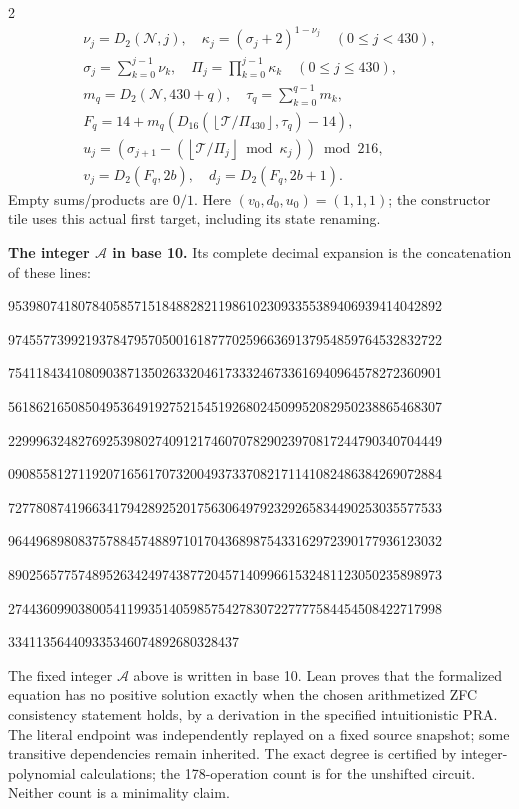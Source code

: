 \documentclass[10pt]{article}
\newcommand{\fl}[1]{\left\lfloor#1\right\rfloor}
\begin{document}
\begin{multicols}{2}
\[\begin{gathered}
\nu_j=D_2(\mathcal N,j),\quad \kappa_j=(\sigma_j+2)^{1-\nu_j}\quad(0\le j<430),\\
\sigma_j=\sum_{k=0}^{j-1}\nu_k,\quad
\Pi_j=\prod_{k=0}^{j-1}\kappa_k\quad(0\le j\le430),\\
m_q=D_2(\mathcal N,430+q),\quad \tau_q=\sum_{k=0}^{q-1}m_k,\\
F_q=14+m_q(D_{16}(\fl{\mathcal T/\Pi_{430}},\tau_q)-14),\\
u_j=(\sigma_{j+1}-(\fl{\mathcal T/\Pi_j}\bmod\kappa_j))\bmod216,\\
v_j=D_2(F_q,2b),\quad d_j=D_2(F_q,2b+1).
\end{gathered}
\]
Empty sums/products are $0/1$. Here $(v_0,d_0,u_0)=(1,1,1)$; the constructor tile
uses this actual first target, including its state renaming.

\textbf{The integer $\mathcal A$ in base 10.}
Its complete decimal expansion is the concatenation of these lines:\par
\begingroup\fontsize{7.7}{8.2}\selectfont{}\par
95398074180784058571518488282119861023093355389406939414042892\par
97455773992193784795705001618777025966369137954859764532832722\par
75411843410809038713502633204617333246733616940964578272360901\par
56186216508504953649192752154519268024509952082950238865468307\par
22999632482769253980274091217460707829023970817244790340704449\par
09085581271192071656170732004937337082171141082486384269072884\par
72778087419663417942892520175630649792329265834490253035577533\par
96449689808375788457488971017043689875433162972390177936123032\par
89025657757489526342497438772045714099661532481123050235898973\par
27443609903800541199351405985754278307227777584454508422717998\par
334113564409335346074892680328437\par
\endgroup
\normalfont\fontsize{7.7}{8.2}\selectfont
The fixed integer $\mathcal A$ above is written in base 10. Lean proves that the formalized equation has no positive solution exactly
when the chosen arithmetized ZFC consistency statement holds, by a derivation
in the specified intuitionistic PRA. The literal endpoint was independently
replayed on a fixed source snapshot; some transitive dependencies remain
inherited. The exact degree is certified by integer-polynomial calculations;
the 178-operation count is for the unshifted circuit. Neither count is a
minimality claim.
\end{multicols}
\end{document}
